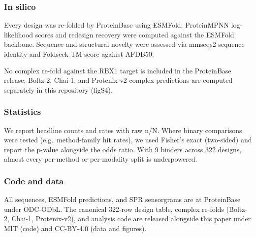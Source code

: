 \subsubsection{In silico}\label{in-silico}

Every design was re-folded by ProteinBase using ESMFold; ProteinMPNN
log-likelihood scores and redesign recovery were computed against the
ESMFold backbone. Sequence and structural novelty were assessed via
mmseqs2 sequence identity and Foldseek TM-score against AFDB50.

No complex re-fold against the RBX1 target is included in the
ProteinBase release; Boltz-2, Chai-1, and Protenix-v2 complex
predictions are computed separately in this repository (figS4).

\subsubsection{Statistics}\label{statistics}

We report headline counts and rates with raw n/N. Where binary
comparisons were tested (e.g.~method-family hit rates), we used Fisher's
exact (two-sided) and report the p-value alongside the odds ratio. With
9 binders across 322 designs, almost every per-method or per-modality
split is underpowered.

\subsubsection{Code and data}\label{code-and-data}

All sequences, ESMFold predictions, and SPR sensorgrams are at
ProteinBase under ODC-ODbL. The canonical 322-row design table, complex
re-folds (Boltz-2, Chai-1, Protenix-v2), and analysis code are released
alongside this paper under MIT (code) and CC-BY-4.0 (data and figures).
